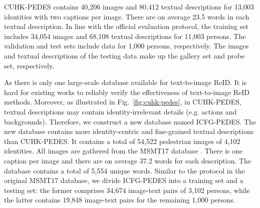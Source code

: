 \documentclass[journal]{IEEEtran}
\begin{document}
CUHK-PEDES contains 40,206 images and 80,412 textual descriptions for 13,003 identities with two captions per image. There are on average 23.5 words in each textual description. In line with the official evaluation protocol, the training set includes 34,054 images and 68,108 textual descriptions for 11,003 persons. The validation and test sets include data for 1,000 persons, respectively. The images and textual descriptions of the testing data make up the gallery set and probe set, respectively.

As there is only one large-scale database available for text-to-image ReID. It is hard for existing works to reliably verify the effectiveness of text-to-image ReID methods. Moreover, as illustrated in Fig.~\ref{fig:cuhk-pedes}, in CUHK-PEDES, textual descriptions may contain identity-irrelevant details (e.g. actions and backgrounds). Therefore, we construct a new database named ICFG-PEDES. The new database contains more identity-centric and fine-grained textual descriptions than CUHK-PEDES. It contains a total of 54,522 pedestrian images of 4,102 identities. All images are gathered from the MSMT17 database \cite{wei2018person}. There is one caption per image and there are on average 37.2 words for each description. The database contains a total of 5,554 unique words. Similar to the protocol in the original MSMT17 database, we divide ICFG-PEDES into a training set and a testing set: the former comprises 34,674 image-text pairs of 3,102 persons, while the latter contains 19,848 image-text pairs for the remaining 1,000 persons.
\end{document}
